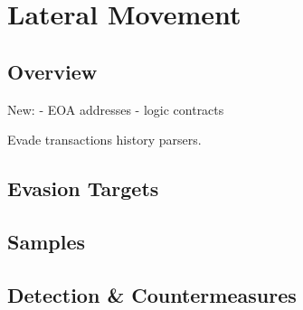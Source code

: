 \section{Lateral Movement} \label{sec:lateral-movement}

\subsection{Overview}

New:
- EOA addresses
- logic contracts

Evade transactions history parsers.

\subsection{Evasion Targets}

\subsection{Samples}

\subsection{Detection \& Countermeasures}
